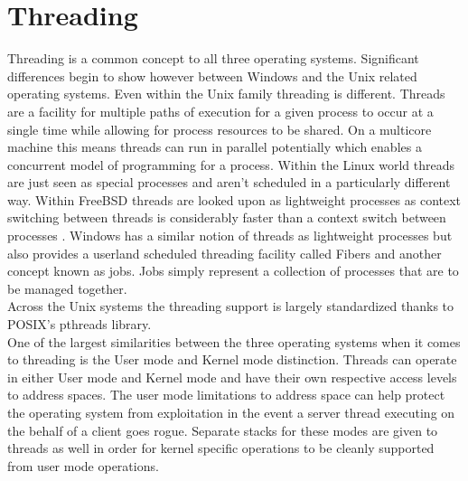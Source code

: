 \documentclass[letterpaper,10pt,draftclsnofoot,onecolumn]{IEEEtran}
\begin{document}
\newpage
\section{Threading}
Threading is a common concept to all three operating systems. Significant differences begin to show however between Windows and the Unix related operating systems. Even within the Unix family threading is different. Threads are a facility for multiple paths of execution for a given process to occur at a single time while allowing for process resources to be shared. On a multicore machine this means threads can run in parallel potentially which enables a concurrent model of programming for a process. Within the Linux world threads are just seen as special processes and aren’t scheduled in a particularly different way. Within FreeBSD threads are looked upon as lightweight processes as context switching between threads is considerably faster than a context switch between processes \cite{mccusick}. Windows has a similar notion of threads as lightweight processes but also provides a userland scheduled threading facility called Fibers and another concept known as jobs. Jobs simply represent a collection of processes that are to be managed together.\\
Across the Unix systems the threading support is largely standardized thanks to POSIX’s pthreads library.\\

One of the largest similarities between the three operating systems when it comes to threading is the User mode and Kernel mode distinction. Threads can operate in either User mode and Kernel mode and have their own respective access levels to address spaces. The user mode limitations to address space can help protect the operating system from exploitation in the event a server thread executing on the behalf of a client goes rogue. Separate stacks for these modes are given to threads as well in order for kernel specific operations to be cleanly supported from user mode operations.
\newpage
\end{document}
